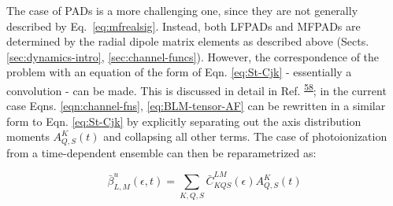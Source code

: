 \documentclass[10pt]{article}
\begin{document}

The case of PADs is a more challenging one, since they are not generally described by Eq.~\ref{eq:mfrealsig}. Instead, both LFPADs and MFPADs are determined by the radial dipole matrix elements as described above (Sects. \ref{sec:dynamics-intro}, \ref{sec:channel-funcs}). However, the correspondence of the problem with an equation of the form of Eqn. \ref{eq:St-Cjk} - essentially a convolution - can be made. This is discussed in detail in Ref. \textsuperscript{\hyperref[csl:58]{58}}; in the current case Eqns. \ref{eqn:channel-fns}, \ref{eq:BLM-tensor-AF} can be rewritten in a similar form to Eqn. \ref{eq:St-Cjk} by explicitly separating out the axis distribution moments $A_{Q,S}^{K}(t)$ and collapsing all other terms. The case of photoionization from a time-dependent ensemble can then be reparametrized as:




\begin{equation}
\bar{\beta}_{L,M}^{u}(\epsilon,t)=\sum_{K,Q,S}\bar{C}_{KQS}^{LM}(\epsilon)A_{Q,S}^{K}(t)
\label{eqn:beta-convolution-C}
\end{equation}
\end{document}
